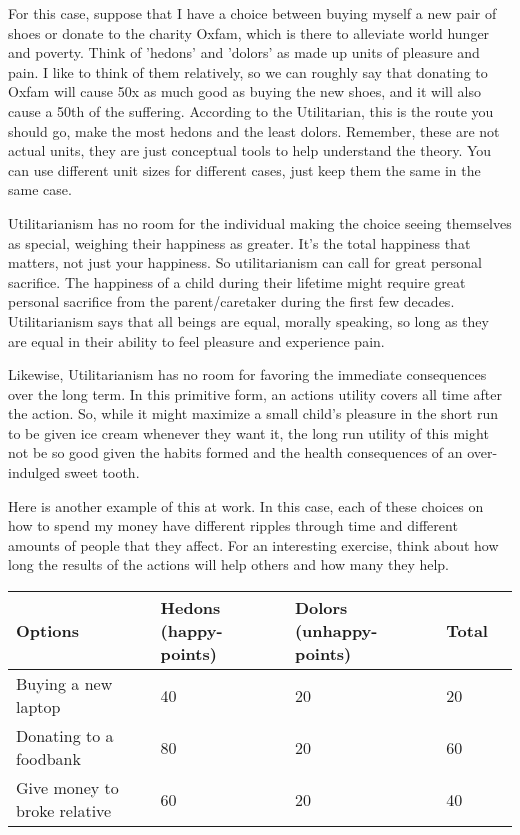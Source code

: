 For this case, suppose that I have a choice between buying myself a new pair of shoes or donate to the charity Oxfam, which is there to alleviate world hunger and poverty. Think of 'hedons' and 'dolors' as made up units of pleasure and pain. I like to think of them relatively, so we can roughly say that donating to Oxfam will cause 50x as much good as buying the new shoes, and it will also cause a 50th of the suffering. According to the Utilitarian, this is the route you should go, make the most hedons and the least dolors.  Remember, these are not actual units, they are just conceptual tools to help understand the theory. You can use different unit sizes for different cases, just keep them the same in the same case.

Utilitarianism has no room for the individual making the choice seeing themselves as special, weighing their happiness as greater. It’s the total happiness that matters, not just your happiness. So utilitarianism can call for great personal sacrifice. The happiness of a child during their lifetime might require great personal sacrifice from the parent/caretaker during the first few decades. Utilitarianism says that all beings are equal, morally speaking, so long as they are equal in their ability to feel pleasure and experience pain.

Likewise, Utilitarianism has no room for favoring the immediate consequences over the long term. In this primitive form, an actions utility covers all time after the action. So, while it might maximize a small child’s pleasure in the short run to be given ice cream whenever they want it, the long run utility of this might not be so good given the habits formed and the health consequences of an over-indulged sweet tooth.

Here is another example of this at work. In this case, each of these choices on how to spend my money have different ripples through time and different amounts of people that they affect. For an interesting exercise, think about how long the results of the actions will help others and how many they help.
	
\begin{tabular}{p{1in}|p{1.5in}|p{1.5in}|p{1in}|p{1in}}
Options&Hedons (happy-points)&Dolors (unhappy-points)&Total\\\hline
Buying a new laptop&40&20&20\\
Donating to a foodbank&80&20&60\\
Give money to broke relative&60&20&40
\end{tabular}

